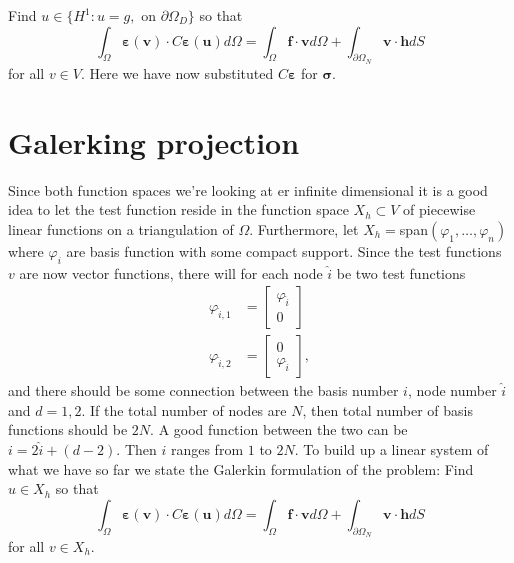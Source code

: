 \documentclass[paper=a4, fontsize=11pt]{scrartcl} %
\begin{document}
Find $u \in \{H^1 : u=g,$ on $\partial\Omega_D\}$ so that
\begin{equation}
\label{VarForm}
\int_{\Omega}\boldsymbol{\varepsilon}(\boldsymbol{v})\cdot C\boldsymbol{\varepsilon}(\boldsymbol{u})d\Omega = \int_{\Omega}\boldsymbol{f}\cdot \boldsymbol{v} d\Omega + \int_{\partial \Omega_N}\boldsymbol{v}\cdot\boldsymbol{h}dS
\end{equation}
for all $v\in V$. Here we have now substituted $C\boldsymbol{\varepsilon}$ for $\boldsymbol{\sigma}$.

\section*{Galerking projection}
Since both function spaces we're looking at er infinite dimensional it is a good idea to let the test function reside in the function space $X_h \subset V$ of piecewise linear functions on a triangulation of $\Omega$. Furthermore, let $X_h =$span$(\varphi_1,\ldots,\varphi_n)$ where $\varphi_i$ are basis function with some compact support. Since the test functions $v$ are now vector functions, there will for each node $\hat{i}$ be two test functions
\begin{align*}
\varphi_{\hat{i},1} &= \begin{bmatrix}
\varphi_{\hat{i}} \\ 0
\end{bmatrix} \\
\varphi_{\hat{i},2} &= \begin{bmatrix}
0 \\ \varphi_{\hat{i}}
\end{bmatrix},
\end{align*}
and there should be some connection between the basis number $i$, node number $\hat{i}$ and $d=1,2$. If the total number of nodes are $N$, then total number of basis functions should be $2N$. A good function between the two can be $i = 2\hat{i}+ (d-2)$. Then $i$ ranges from $1$ to $2N$. To build up a linear system of what we have so far we state the Galerkin formulation of the problem: Find $u \in X_h$ so that
\begin{equation}
\label{Galerkin}
\int_{\Omega}\boldsymbol{\varepsilon}(\boldsymbol{v})\cdot C\boldsymbol{\varepsilon}(\boldsymbol{u})d\Omega = \int_{\Omega}\boldsymbol{f}\cdot \boldsymbol{v} d\Omega + \int_{\partial \Omega_N}\boldsymbol{v}\cdot\boldsymbol{h}dS
\end{equation}
for all $v\in X_h$.
\end{document}
